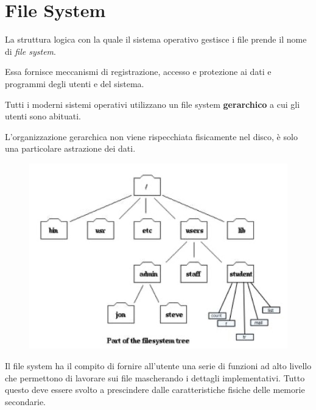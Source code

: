 \chapter{File System}

La struttura logica con la quale il sistema operativo gestisce i file prende il nome di \textit{file system}.

Essa fornisce meccanismi di registrazione, accesso e protezione ai dati e programmi degli utenti e del sistema.

\spacer
Tutti i moderni sistemi operativi utilizzano un file system \textbf{gerarchico} a cui gli utenti sono abituati.

L'organizzazione gerarchica non viene rispecchiata fisicamente nel disco, è solo una particolare astrazione dei dati.

\begin{figure}[H]
    \centering
    \includegraphics[width=0.36\linewidth]{assets/HFS.jpg}
\end{figure}

Il file system ha il compito di fornire all'utente una serie di funzioni ad alto livello che permettono di lavorare sui file mascherando i dettagli implementativi. Tutto questo deve essere svolto a prescindere dalle caratteristiche fisiche delle memorie secondarie.



